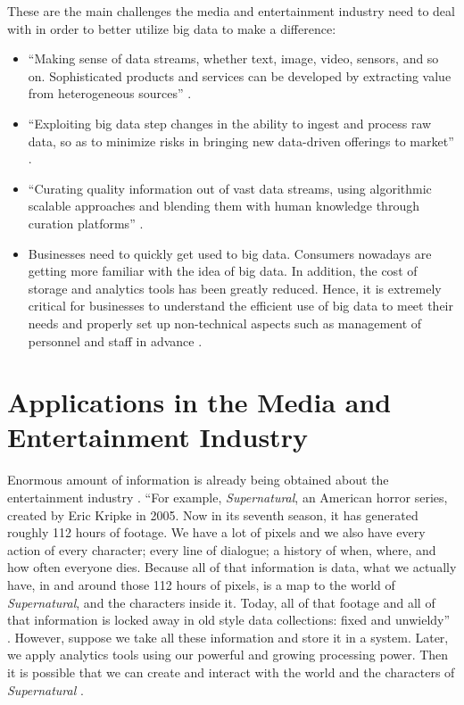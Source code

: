 These are the main challenges the media and entertainment industry need to deal with in order to better utilize big data to make a difference:
\begin{itemize}

  \item ``Making sense of data streams, whether text, image, video, sensors, and so on. Sophisticated products and services can be developed by extracting value from heterogeneous sources'' \cite{Lippell2016sectors}.
 
  \item ``Exploiting big data step changes in the ability to ingest and process raw data, so as to minimize risks in bringing new data-driven offerings to market'' \cite{Lippell2016sectors}.
 
  \item ``Curating quality information out of vast data streams, using algorithmic scalable approaches and blending them with human knowledge through curation platforms'' \cite{Lippell2016sectors}.
 
  \item Businesses need to quickly get used to big data. Consumers nowadays are getting more familiar with the idea of big data. In addition, the cost of storage and analytics tools has been greatly reduced. Hence, it is extremely critical for businesses to understand the efficient use of big data to meet their needs and properly set up non-technical aspects such as management of personnel and staff in advance \cite{Lippell2016sectors}.
 
\end{itemize}

\section{Applications in the Media and Entertainment Industry}

Enormous amount of information is already being obtained about the entertainment industry \cite{Schlieski2012data}. ``For example, {\em Supernatural}, an American horror series, created by Eric Kripke in 2005. Now in its seventh season, it has generated roughly 112 hours of footage. We have a lot of pixels and we also have every action of every character; every line of dialogue; a history of when, where, and how often everyone dies. Because all of that information is data, what we actually have, in and around those 112 hours of pixels, is a map to the world of {\em Supernatural}, and the characters inside it. Today, all of that footage and all of that information is locked away in old style data collections: fixed and unwieldy'' \cite{Schlieski2012data}. However, suppose we take all these information and store it in a system. Later, we apply analytics tools using our powerful and growing processing power. Then it is possible that we can create and interact with the world and the characters of {\em Supernatural} \cite{Schlieski2012data}.


